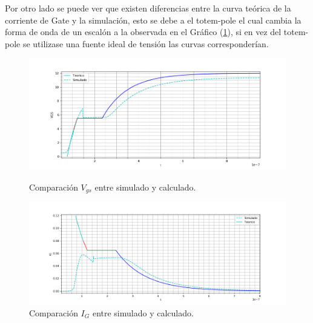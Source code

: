 Por otro lado se puede ver que existen diferencias entre la curva teórica de la corriente de Gate y la simulación, esto se debe a el totem-pole  el cual cambia la forma de onda de un escalón a la observada en el Gráfico (\ref{ej1:fig:sim_encendido_gate_i}), si en vez del totem-pole se utilizase una fuente ideal de tensión las curvas corresponderían.

\begin{figure}[H]
	\centering
	\begin{minipage}{0.5\textwidth}
		\centering
		\includegraphics[width=1.1\textwidth]{ImagenesEjercicio-1/sim_encendido_gate} %
		\caption{Comparación $V_{gs}$ entre simulado y calculado.}
		\label{ej1:fig:sim_encendido_gate}
	\end{minipage}\hfill
	\begin{minipage}{0.5\textwidth}
		\centering
		\includegraphics[width=1.1\textwidth]{ImagenesEjercicio-1/sim_encendido_gate_i} %
		\caption{Comparación $I_{G}$ entre simulado y calculado.}
		\label{ej1:fig:sim_encendido_gate_i}
	\end{minipage}
\end{figure}

